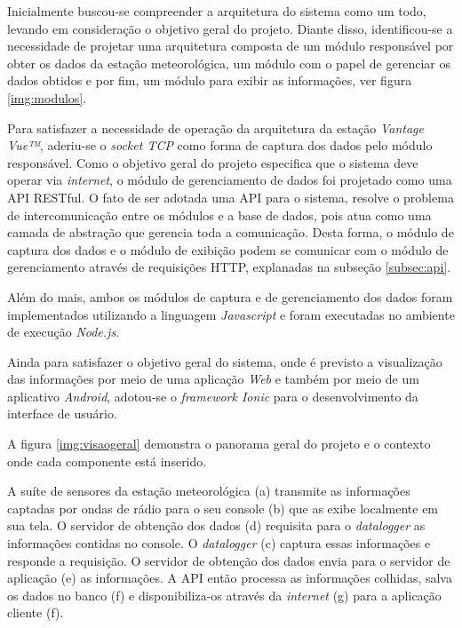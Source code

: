 Inicialmente buscou-se compreender a arquitetura do sistema como um todo, levando em consideração o objetivo geral do projeto. Diante disso, identificou-se a necessidade de projetar uma arquitetura composta de um módulo responsável por obter os dados da estação meteorológica, um módulo com o papel de gerenciar os dados obtidos e por fim, um módulo para exibir as informações, ver figura \ref{img:modulos}.


Para satisfazer a necessidade de operação da arquitetura da estação \textit{Vantage Vue™}, aderiu-se o \textit{socket TCP} como forma de captura dos dados pelo módulo responsável. Como o objetivo geral do projeto especifica que o sistema deve operar via \textit{internet}, o módulo de gerenciamento de dados foi projetado como uma API RESTful. O fato de ser adotada uma API para o sistema, resolve o problema de intercomunicação entre os módulos e a base de dados, pois atua como uma camada de abstração que gerencia toda a comunicação. Desta forma, o módulo de captura dos dados e o módulo de exibição podem se comunicar com o módulo de gerenciamento através de requisições HTTP, explanadas na subseção \ref{subsec:api}.

Além do mais, ambos os módulos de captura e de gerenciamento dos dados foram implementados utilizando a linguagem \textit{Javascript} e foram executadas no ambiente de execução \textit{Node.js}.
 
Ainda para satisfazer o objetivo geral do sistema, onde é previsto a visualização das informações por meio de uma aplicação \textit{Web} e também por meio de um aplicativo \textit{Android}, adotou-se o \textit{framework Ionic} para o desenvolvimento da interface de usuário.

A figura \ref{img:visaogeral}  demonstra o panorama geral do projeto e o contexto onde cada componente está inserido.


\newpage

A suíte de sensores da estação meteorológica (a) transmite as informações captadas por ondas de rádio para o seu console (b) que as exibe localmente em sua tela. O servidor de obtenção dos dados (d) requisita para o \textit{datalogger} as informações contidas no console. O \textit{datalogger} (c) captura essas informações e responde a requisição. O servidor de obtenção dos dados envia para o servidor de aplicação (e) as informações. A API então processa as informações colhidas, salva os dados no banco (f) e disponibiliza-os através da \textit{internet} (g) para a aplicação cliente (f).



